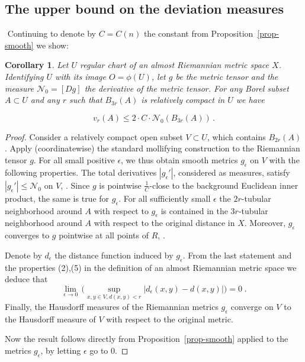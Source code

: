 \documentclass[12pt,leqno,intlimits]{amsart}
\numberwithin{equation}{section}
\newtheorem{cor}[thm]{Corollary}
\theoremstyle{definition}
\theoremstyle{remark}
\newcommand{\pref}[1]{Proposition~\ref{#1}}
\begin{document}










\subsection{The upper bound on the deviation  measures}
$  $
%
 Continuing to denote by $C=C(n)$ the constant from  Proposition~\ref{prop-smooth} we show:

\begin{cor} \label{cor-dc-vr}
Let $U$ regular chart of an almost Riemannian metric space $X$. Identifying $U$ with its image $O=\phi (U)$, let
$g$ be the metric tensor and the measure $\mathcal N_0 =[Dg]$ the  derivative of the metric tensor.  For any Borel subset $A\subset U$ and any $r$
such that $B_{3r} (A)$ is relatively compact in $U$ we have

\[
v_r (A) \leq 2 \cdot C \cdot  \mathcal N_0 (B_{3r} (A))\, .
\]
\end{cor}

\begin{proof}
Consider a relatively compact open subset $ V \subset U$, which contains $B_{2r} (A)$.  Apply (coordinatewise) the standard mollifying construction
to the Riemannian tensor $g$.  For all small positive $\epsilon$, we thus obtain  smooth metrics $g_{\epsilon}$ on $V$ with the following properties.
The total derivatives $|g_{\epsilon} '|$, considered as measures, satisfy  $|g_{\epsilon} '|\leq \mathcal N_0$ on $V$, \cite[Theorem 5.3.1]{Ziemer}.   Since $g$ is pointwise   $\frac 1 C$-close to the background Euclidean inner product, the same is true for  $g_{\epsilon}$.  For all sufficiently small $\epsilon$ the $2r$-tubular neighborhood around $A$ with respect to $g_{\epsilon}$ is contained in the $3r$-tubular neighborhood around $A$ with respect to the original distance in $X$. Moreover, $g_{\epsilon}$ converges to $g$ pointwise at all points of $R$, \cite[Theorem 1.6.1]{Ziemer}.

 Denote by $d_{\epsilon}$ the distance function induced by $g_{\epsilon}$.  From the last statement and the  properties (2),(5) in the definition of an almost Riemannian metric space we deduce that
\[
\lim _{\epsilon \to 0}\, \Big (\sup _{x,y \in V, d(x,y) <r} |d_{\epsilon} (x,y) -d(x,y)|\Big )=0 \; .
\]
 Finally, the Hausdorff measures of the Riemannian metrics $g_{\epsilon}$ converge on $V$ to the Hausdorff measure of $V$ with respect to the original metric.

 Now the result follows directly  from \pref{prop-smooth} applied to the metrics $g_{\epsilon}$, by letting $\epsilon$ go to $0$.
\end{proof}
\end{document}
